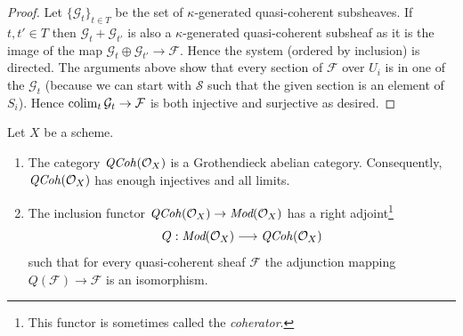 \begin{proof}
\medskip\noindent
Let $\{\mathcal{G}_t\}_{t \in T}$ be the set of $\kappa$-generated
quasi-coherent subsheaves. If $t, t' \in T$ then
$\mathcal{G}_t + \mathcal{G}_{t'}$ is also a $\kappa$-generated
quasi-coherent subsheaf as it is the image of the map
$\mathcal{G}_t \oplus \mathcal{G}_{t'} \to \mathcal{F}$.
Hence the system (ordered by inclusion) is directed.
The arguments above show that every section of $\mathcal{F}$ over $U_i$
is in one of the $\mathcal{G}_t$ (because we can start with $\mathcal{S}$
such that the given section is an element of $S_i$). Hence
$\mathop{\mathrm{colim}}\nolimits_t \mathcal{G}_t \to \mathcal{F}$ is both injective and surjective
as desired.
\end{proof}

\begin{proposition}
\label{proposition-coherator}
Let $X$ be a scheme.
\begin{enumerate}
\item The category $\mathit{QCoh}(\mathcal{O}_X)$ is a Grothendieck
abelian category. Consequently, $\mathit{QCoh}(\mathcal{O}_X)$
has enough injectives and all limits.
\item The inclusion functor
$\mathit{QCoh}(\mathcal{O}_X) \to \textit{Mod}(\mathcal{O}_X)$
has a right adjoint\footnote{This functor is sometimes called
the {\it coherator}.}
$$
Q : \textit{Mod}(\mathcal{O}_X) \longrightarrow \mathit{QCoh}(\mathcal{O}_X)
$$
such that for every quasi-coherent sheaf $\mathcal{F}$ the adjunction mapping
$Q(\mathcal{F}) \to \mathcal{F}$ is an isomorphism.
\end{enumerate}
\end{proposition}

